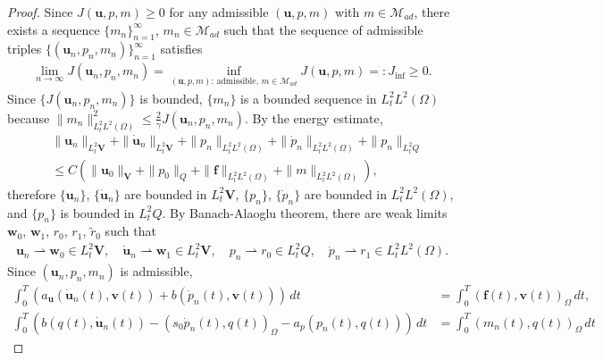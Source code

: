 \documentclass{amsart}
\newcommand{\algn}[1]{\begin{align} #1 \end{align}}
\newcommand{\mc}[1]{\mathcal{#1}}
\newcommand{\LRp}[1]{\left( #1 \right)}
\begin{document}
\begin{proof}
	Since $J \LRp{\boldsymbol{u}, p, m} \ge 0$ for any admissible $\LRp{\boldsymbol{u}, p, m}$ with $m \in \mc{M}_{ad}$, there exists a sequence $\{ m_n \}_{n=1}^{\infty}$, $m_n \in \mc{M}_{ad}$ such that the sequence of admissible triples $\{ \LRp{\boldsymbol{u}_n, p_n, m_n} \}_{n=1}^{\infty}$ satisfies
	\algn{
		\nonumber \lim_{n \to \infty} J \LRp{\boldsymbol{u}_n, p_n, m_n} =\inf_{\LRp{\boldsymbol{u}, p, m} \text{: admissible, } m \in \mc{M}_{ad}} J \LRp{\boldsymbol{u}, p, m} =: J_{\text{inf}} \ge 0 .
	}
	Since $\{ J \LRp{\boldsymbol{u}_n, p_n, m_n} \}$ is bounded, $\{m_n\}$ is a bounded sequence in $L_t^2 L^2(\Omega)$ because $\|m_n\|_{L_t^2 L^2(\Omega)}^2 \le \frac{2}{\gamma} J \LRp{\boldsymbol{u}_n, p_n, m_n}$. By the energy estimate,
	\algn{
		\nonumber &\|\boldsymbol{u}_n\|_{L_t^2 \boldsymbol{V}} + \|\dot{\boldsymbol{u}}_n\|_{L_t^2 \boldsymbol{V}} + \|p_n\|_{L_t^2 L^2(\Omega)} + \|\dot{p}_n\|_{L_t^2 L^2(\Omega)} + \|p_n\|_{L_t^2 Q} \\
		\nonumber &\le C \LRp{\|\boldsymbol{u}_0\|_{\boldsymbol{V}} + \|p_0\|_{Q} + \|\boldsymbol{f}\|_{L_t^2 L^2(\Omega)} + \|m\|_{L_t^2 L^2(\Omega)}},
	}
	therefore $\{\boldsymbol{u}_n\}$, $\{\dot{\boldsymbol{u}}_n\}$ are bounded in $L_t^2 \boldsymbol{V}$, $\{p_n\}$, $\{\dot{p}_n\}$ are bounded in $L_t^2 L^2(\Omega)$, and $\{p_n\}$ is bounded in $L_t^2 Q$. By Banach-Alaoglu theorem, there are weak limits $\boldsymbol{w}_0$, $\boldsymbol{w}_1$, $r_0$, $r_1$, $\tilde{r}_0$ such that
	\begin{align*}
		\boldsymbol{u}_n \rightharpoonup \boldsymbol{w}_0 \in L_t^2 \boldsymbol{V}, \quad \dot{\boldsymbol{u}}_n \rightharpoonup \boldsymbol{w}_1 \in L_t^2 \boldsymbol{V}, \quad p_n \rightharpoonup r_0 \in L_t^2Q, \quad \dot{p}_n \rightharpoonup r_1 \in L_t^2 L^2(\Omega).
	\end{align*}
	Since $\LRp{\boldsymbol{u}_n, p_n, m_n}$ is admissible,
	\algn{ \label{eq:admissible-seq}
		\int_0^T \LRp{a_{\boldsymbol{u}} \LRp{\dot{\boldsymbol{u}}_n (t), \boldsymbol{v} (t)} + b \LRp{\dot{p}_n (t), \boldsymbol{v} (t)}} \, dt &= \int_0^T \LRp{\boldsymbol{f} (t), \boldsymbol{v} (t)}_{\Omega} \, dt, \\
		\nonumber \int_0^T \LRp{b \LRp{q(t), \dot{\boldsymbol{u}}_n (t)} - \LRp{s_0 \dot{p}_n (t), q(t)}_{\Omega} - a_p\LRp{ p_n (t), q(t)}} \, dt &= \int_0^T \LRp{m_n (t), q(t)}_{\Omega} \, dt
}
\end{proof}
\end{document}
